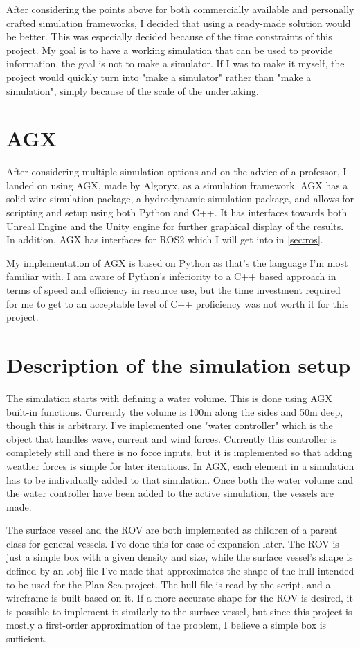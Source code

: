 After considering the points above for both commercially available and personally crafted simulation frameworks, I decided that using a ready-made solution would be better. This was especially decided because of the time constraints of this project. My goal is to have a working simulation that can be used to provide information, the goal is not to make a simulator. If I was to make it myself, the project would quickly turn into "make a simulator" rather than "make a simulation", simply because of the scale of the undertaking. 

\section{AGX}
After considering multiple simulation options and on the advice of a professor, I landed on using AGX, made by Algoryx, as a simulation framework. AGX has a solid wire simulation package, a hydrodynamic simulation package, and allows for scripting and setup using both Python and C++. It has interfaces towards both Unreal Engine and the Unity engine for further graphical display of the results. In addition, AGX has interfaces for ROS2 which I will get into in \cref{sec:ros}. 

My implementation of AGX is based on Python as that's the language I'm most familiar with. I am aware of Python's inferiority to a C++ based approach in terms of speed and efficiency in resource use, but the time investment required for me to get to an acceptable level of C++ proficiency was not worth it for this project.

\section{Description of the simulation setup}
The simulation starts with defining a water volume. This is done using AGX built-in functions. Currently the volume is 100m along the sides and 50m deep, though this is arbitrary. I've implemented one "water controller" which is the object that handles wave, current and wind forces. Currently this controller is completely still and there is no force inputs, but it is implemented so that adding weather forces is simple for later iterations. In AGX, each element in a simulation has to be individually added to that simulation. Once both the water volume and the water controller have been added to the active simulation, the vessels are made.

The surface vessel and the ROV are both implemented as children of a parent class for general vessels. I've done this for ease of expansion later. The ROV is just a simple box with a given density and size, while the surface vessel's shape is defined by an .obj file I've made that approximates the shape of the hull intended to be used for the Plan Sea project. The hull file is read by the script, and a wireframe is built based on it. If a more accurate shape for the ROV is desired, it is possible to implement it similarly to the surface vessel, but since this project is mostly a first-order approximation of the problem, I believe a simple box is sufficient.  

